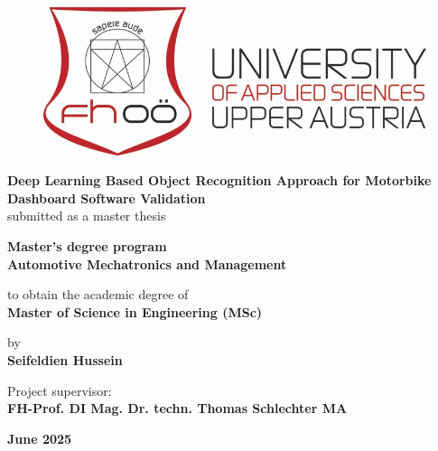 \begin{titlepage}
    \begin{center}
        \vspace*{0.5cm}
        
        \begin{figure}
            \centering
            \includegraphics[width=0.75\linewidth]{Figures/FH_Logo.png}
        \end{figure}
        
        \Huge\textbf{Deep Learning Based Object Recognition Approach for Motorbike Dashboard Software Validation}\\
        
        \vspace{0.5cm}
        \large{submitted as a master thesis}\\
        
        \vfill
        
        \textbf{Master's degree program}\\
        \textbf{Automotive Mechatronics and Management}\\
        
        \vspace{0.5cm}
        
        to obtain the academic degree of\\
        \textbf{Master of Science in Engineering (MSc)}\\
        
        \vfill
        
        by\\
        \textbf{Seifeldien Hussein}\\
        
        \vfill
        
        Project supervisor:\\
        \textbf{FH-Prof. DI Mag. Dr. techn. Thomas Schlechter MA} \\ 
        
        \vspace{0.8cm}
        
         \textbf{June 2025}
        
    \end{center}
\end{titlepage}
